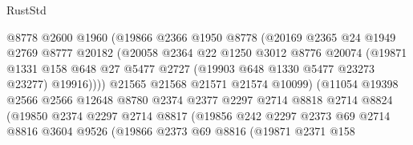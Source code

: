 \begin{lexlean}{RustStd}
\begin{coremodule}
{\begin{coremodule}
{{{{{{{{{{{{{{{{{{{{{{{{{{{{{{{{{{{{{{{                            @8778
                            @2600
                            @1960
                            (@19866
                              @2366
                              @1950
                              @8778
                              (@20169
                                @2365
                                @24
                                @1949
                                @2769
                                @8777
                                @20182
                                (@20058
                                  @2364
                                  @22
                                  @1250
                                  @3012
                                  @8776
                                  @20074
                                  (@19871
                                    @1331
                                    @158
                                    @648
                                    @27
                                    @5477
                                    @2727
                                    (@19903 @648 @1330 @5477 @23273 @23277)
                                    @19916))))
                            @21565
                            @21568
                            @21571
                            @21574
                            @10099)
                          (@11054
                            @19398
                            @2566
                            @2566
                            @12648
                            @8780
                            @2374
                            @2377
                            @2297
                            @2714
                            @8818
                            @2714
                            @8824
                            (@19850
                              @2374
                              @2297
                              @2714
                              @8817
                              (@19856
                                @242
                                @2297
                                @2373
                                @69
                                @2714
                                @8816
                                @3604
                                @9526
                                (@19866
                                  @2373
                                  @69
                                  @8816
                                  (@19871
                                    @2371
                                    @158
}}}}}}}}}}}}}}}}}}}}}}}}}}}}}}}}}}}}}}}
\end{coremodule}}
\end{coremodule}
\end{lexlean}
